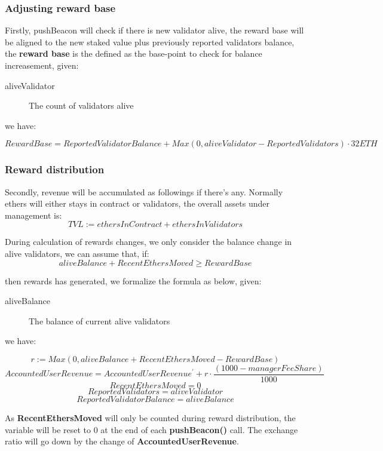 \documentclass{article}
\begin{document}
\subsubsection{Adjusting reward base}
Firstly, pushBeacon will check if there is new validator alive, the reward base will be aligned to the new staked value plus previously reported validators balance, the \textbf{reward base} is the defined as the base-point to check for balance increasement, given:
\begin{description}
\item[aliveValidator] The count of validators alive
\end{description}
we have:
\begin{theorem}
\label{pushBeacon}
\[RewardBase = ReportedValidatorBalance + Max(0, aliveValidator - ReportedValidators) \cdot  32 ETH\]
\end{theorem}

\subsubsection{Reward distribution}
Secondly, revenue will be accumulated as followings if there's any. Normally ethers will either stays in contract or validators, the overall assets under management is:
\[TVL := ethersInContract + ethersInValidators\]

During calculation of rewards changes, we only consider the balance change in alive validators, we can assume that, if:
\[aliveBalance + RecentEthersMoved \geq RewardBase\]

then rewards has generated, we formalize the formula as below, given:

\begin{description}
\item[aliveBalance] The balance of current alive validators
\end{description}
we have:

\begin{theorem}
\label{calcReward}
\[r := Max(0, aliveBalance + RecentEthersMoved - RewardBase)\]
\[AccountedUserRevenue = AccountedUserRevenue^{\prime} + r \cdot \frac{(1000 - managerFeeShare)}{1000}\]
\[RecentEthersMoved = 0\]
\[ReportedValidators = aliveValidator\]
\[ReportedValidatorBalance = aliveBalance\]
\end{theorem}

As \textbf{RecentEthersMoved} will only be counted during reward distribution, the variable will be reset to 0 at the end of each \textbf{pushBeacon()} call. The exchange ratio will go down by the change of \textbf{AccountedUserRevenue}.
\end{document}

